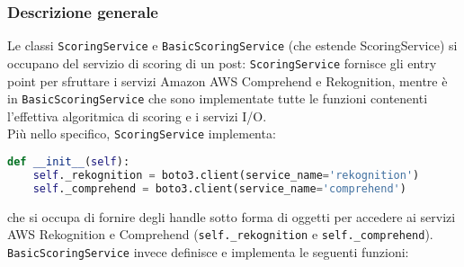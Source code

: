 \subsubsection{Descrizione generale}
Le classi \verb+ScoringService+ e \verb+BasicScoringService+ (che estende ScoringService\verb++) si occupano
del servizio di scoring di un post: \verb+ScoringService+ fornisce gli entry point per sfruttare 
i servizi Amazon AWS Comprehend e Rekognition, mentre è in \verb+BasicScoringService+ che sono 
implementate tutte le funzioni contenenti l'effettiva algoritmica di scoring e i servizi I/O.\\
Più nello specifico, \verb+ScoringService+ implementa:
\begin{lstlisting}[language=Python]
def __init__(self):
    self._rekognition = boto3.client(service_name='rekognition')
    self._comprehend = boto3.client(service_name='comprehend')
\end{lstlisting}
che si occupa di fornire degli handle sotto forma di oggetti per accedere ai servizi AWS Rekognition
e Comprehend (\verb+self._rekognition+ e \verb+self._comprehend+).\\
\verb+BasicScoringService+ invece definisce e implementa le seguenti funzioni:

